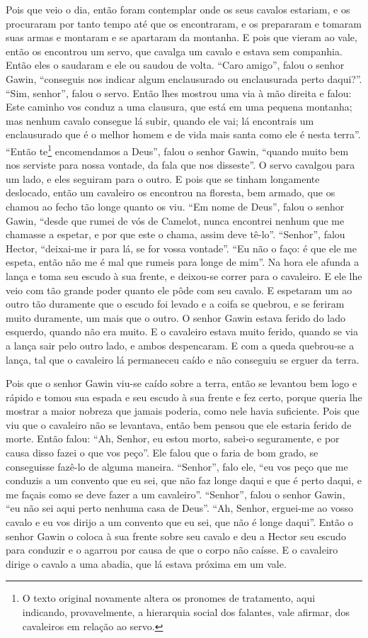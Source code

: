Pois que veio o dia, então foram contemplar onde os seus cavalos estariam, e os
procuraram por tanto tempo até que os encontraram, e os prepararam e tomaram
suas armas e montaram e se apartaram da montanha. E pois que vieram ao vale,
então os encontrou um servo, que cavalga um cavalo e estava sem companhia.
Então eles o saudaram e ele ou saudou de volta. “Caro amigo”, falou o senhor
Gawin, “conseguis nos indicar algum enclausurado ou enclausurada perto daqui?”.
“Sim, senhor”, falou o servo. Então lhes mostrou uma via à mão direita e falou:
Este caminho vos conduz a uma clausura, que está em uma pequena montanha; mas
nenhum cavalo consegue lá subir, quando ele vai; lá encontrais um enclausurado
que é o melhor homem e de vida mais santa como ele é nesta terra”. “Então
te\footnote{ O texto original  novamente altera os pronomes de tratamento, aqui
indicando, provavelmente, a hierarquia social dos falantes, vale afirmar, dos
cavaleiros em relação ao servo.}  encomendamos a Deus”, falou o
senhor Gawin, “quando muito bem nos serviste para nossa vontade, da fala que
nos disseste”.  O servo cavalgou para um lado, e eles seguiram para o
outro. E pois que se tinham longamente deslocado, então um cavaleiro os
encontrou na floresta, bem armado, que os chamou ao fecho tão longe quanto os
viu. “Em nome de Deus”, falou o senhor Gawin, “desde que rumei de vós de
Camelot, nunca encontrei nenhum que me chamasse a espetar, e por que este o
chama, assim deve tê-lo”. “Senhor”, falou Hector, “deixai-me ir para lá, se for
vossa vontade”. “Eu não o faço: é que ele me espeta, então não me é mal que
rumeis para longe de mim”. Na hora ele afunda a lança e toma seu escudo à sua
frente, e deixou-se correr para o cavaleiro. E ele lhe veio com tão grande
poder quanto ele pôde com seu cavalo. E espetaram um ao outro  tão duramente
que o escudo foi levado e a coifa se quebrou, e se feriram muito duramente, um
mais que o outro. O senhor Gawin estava ferido do lado esquerdo, quando não era
muito. E o cavaleiro estava muito ferido, quando se via a lança sair pelo outro
lado, e ambos despencaram. E com a queda quebrou-se a lança, tal que o
cavaleiro lá permaneceu caído e não conseguiu se erguer da terra. 

Pois que o senhor Gawin viu-se caído sobre a terra, então se levantou bem logo e
rápido e tomou sua espada e seu escudo à sua frente e fez certo, porque queria
lhe mostrar a maior nobreza que jamais poderia, como nele havia suficiente.
Pois que viu que o cavaleiro não se levantava, então bem pensou que ele estaria
ferido de morte. Então falou: “Ah, Senhor, eu estou morto, sabei-o
seguramente, e por causa disso fazei o que vos peço”. Ele falou que o faria de
bom grado, se conseguisse fazê-lo de alguma maneira. “Senhor”, falo ele, “eu
vos peço que me conduzis a um convento que eu sei, que não faz longe daqui e
que é perto daqui, e me façais como se deve fazer a um cavaleiro”. “Senhor”,
falou o senhor Gawin, “eu não sei aqui perto nenhuma casa de Deus”. “Ah,
Senhor, erguei-me ao vosso cavalo e eu vos dirijo a um convento que eu sei, que
não é longe daqui”. Então o senhor Gawin o coloca à sua frente sobre seu cavalo
e deu a Hector seu escudo para conduzir e o agarrou por causa de que o corpo
não caísse. E o cavaleiro dirige o cavalo a uma abadia, que lá estava próxima
em um vale.

